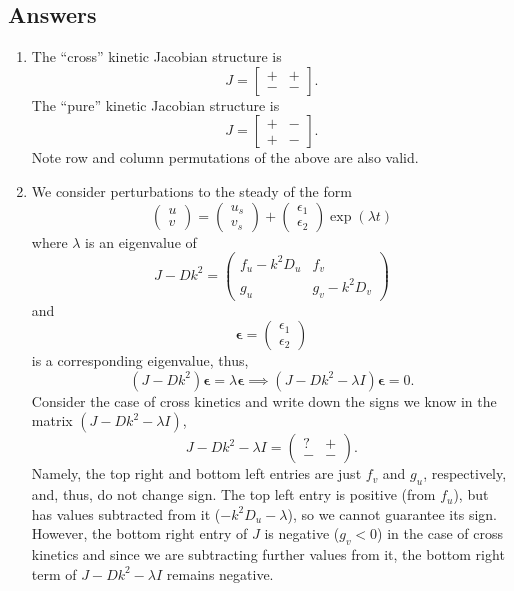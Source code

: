 \documentclass[10pt]{article}
\newcommand{\bb}{\begin{equation}}
\newcommand{\ee}{\end{equation}}
\renewcommand{\l}{\left(}
\renewcommand{\r}{\right)}
\begin{document}
\begin{Answ}
\subsection{Answers}
\begin{enumerate}
\item The ``cross'' kinetic Jacobian structure is
\bb
J=\left[ \begin {array}{cc} + & + \\ - & -\end {array} \right].
\ee
The ``pure'' kinetic Jacobian structure is
\bb
J=\left[ \begin {array}{cc} + & - \\ + & -\end {array} \right].
\ee
Note row and column permutations of the above are also valid.




\item We consider perturbations to the steady of the form
\bb
\l\begin {array}{c} u \\ v\end {array} \r=\l\begin {array}{c} u_s \\ v_s \end {array} \r+\l\begin {array}{c} \epsilon_1 \\ \epsilon_2\end {array} \r\exp(\lambda t)
\ee
where $\lambda$ is an eigenvalue of
\bb
J-Dk^2=\l\begin {array}{cc} f_u-k^2D_u & f_v \\  g_u & g_v-k^2D_v \end {array} \r
\ee
and
\bb
\bm{\epsilon}=\l\begin {array}{c} \epsilon_1 \\ \epsilon_2\end {array} \r
\ee
is a corresponding eigenvalue, thus,
\bb
(J-Dk^2)\bm{\epsilon}=\lambda \bm{\epsilon} \implies (J-Dk^2-\lambda I)\bm{\epsilon}=0.\label{Eig_eqn}
\ee
Consider the case of cross kinetics and write down the signs we know in the matrix $(J-Dk^2-\lambda I)$,
\bb
J-Dk^2-\lambda I=\l\begin {array}{cc} ? & + \\  - & - \end {array}\r.
\ee
Namely, the top right and bottom left entries are just $f_v$ and $g_u$, respectively, and, thus, do not change sign. The top left entry is positive (from $f_u$), but has values subtracted from it ($-k^2D_u-\lambda$), so we cannot guarantee its sign. However, the bottom right entry of $J$ is negative ($g_v<0$) in the case of cross kinetics and since we are subtracting further values from it, the bottom right term of $J-Dk^2-\lambda I$ remains negative.


\end{enumerate}
\end{Answ}
\end{document}
